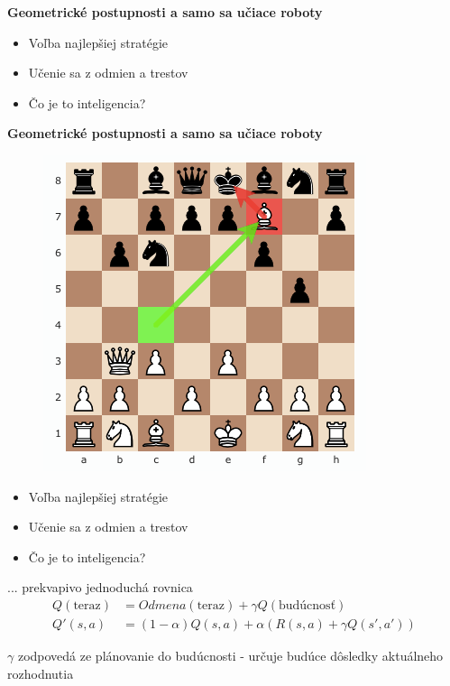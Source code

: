 \documentclass[xcolor=dvipsnames]{beamer}
\begin{document}
\begin{frame}{\bf Geometrické postupnosti a samo sa učiace roboty}
\begin{minipage}[c]{0.5\textwidth}
\begin{itemize}
 \item Voľba najlepšiej stratégie
 \item Učenie sa z odmien a trestov
 \item Čo je to inteligencia?
\end{itemize}

\end{minipage}%


\end{frame}




\begin{frame}{\bf Geometrické postupnosti a samo sa učiace roboty}

\begin{minipage}[r]{0.5\textwidth}
    \begin{figure}[htbp]
      \centering
        \includegraphics[scale=0.3]{chess.png}
    \end{figure}
\end{minipage}%
\hfill
\begin{minipage}[c]{0.5\textwidth}
  \begin{itemize}
   \item Voľba najlepšiej stratégie
   \item Učenie sa z odmien a trestov
   \item Čo je to inteligencia?
  \end{itemize}
\end{minipage}%

... prekvapivo jednoduchá rovnica \footnotemark
\begin{align*}
Q(\text{teraz}) &= Odmena(\text{teraz}) + \gamma Q(\text{budúcnosť}) \\
Q'(s, a) &= (1-\alpha)Q(s, a) + \alpha(R(s, a) + \gamma Q(s', a'))
\end{align*}

$\gamma$ zodpovedá ze plánovanie do budúcnosti - určuje budúce dôsledky
aktuálneho rozhodnutia
\end{frame}
\end{document}
